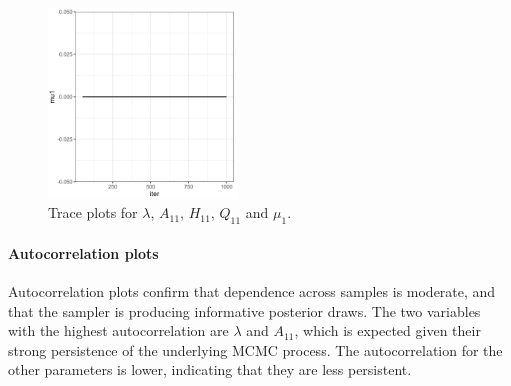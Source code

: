\begin{figure}[H]
    \includegraphics[width=0.45\textwidth]{../figures/trace_mu1.png}
    \caption{Trace plots for $\lambda$, $A_{11}$, $H_{11}$, $Q_{11}$ and $\mu_1$.}
\end{figure}

\paragraph{Autocorrelation plots} Autocorrelation plots confirm that dependence across samples is moderate, and that the sampler is producing informative posterior draws. The two variables with the highest autocorrelation are $\lambda$ and $A_{11}$, which is expected given their strong persistence of the underlying MCMC process. The autocorrelation for the other parameters is lower, indicating that they are less persistent.
